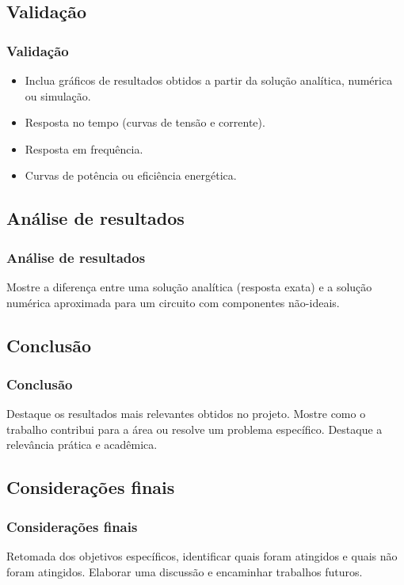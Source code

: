 \documentclass[hyperref={colorlinks=true,    
allcolors = blue,citecolor=blue}]{beamer} %
\begin{document}
\begin{frame}
\subsection{Validação}
\frametitle{Validação}

\begin{itemize}
    \item Inclua gráficos de resultados obtidos a partir da solução analítica, numérica ou simulação.
    \item Resposta no tempo (curvas de tensão e corrente).
    \item Resposta em frequência.
    \item Curvas de potência ou eficiência energética.
\end{itemize}

\end{frame}
\begin{frame}
\subsection{Análise de resultados}
\frametitle{Análise de resultados}

Mostre a diferença entre uma solução analítica (resposta exata) e a solução numérica aproximada para um circuito com componentes não-ideais.

\end{frame}
\begin{frame}
\section{Conclusão}
\frametitle{Conclusão}

Destaque os resultados mais relevantes obtidos no projeto. Mostre como o trabalho contribui para a área ou resolve um problema específico. Destaque a relevância prática e acadêmica.

\end{frame}
\begin{frame}
\subsection{Considerações finais}
\frametitle{Considerações finais}

Retomada dos objetivos específicos, identificar quais foram atingidos e quais não foram atingidos. Elaborar uma discussão e encaminhar trabalhos futuros.

\end{frame}
\end{document}
